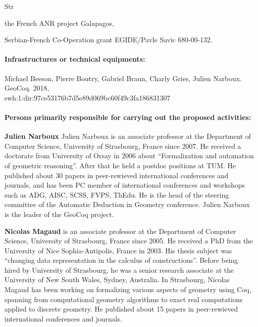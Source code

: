 \begin{sitedescription}{Str}
\begin{compactitem}
\item the French ANR project Galapagos,
\item Serbian-French Co-Operation grant EGIDE/Pavle Savic 680-00-132.
\end{compactitem}

\paragraph*{Infrastructures or technical equipments:}

\begin{compactitem}
\item Michael Beeson, Pierre Boutry, Gabriel Braun, Charly Gries, Julien Narboux. GeoCoq. 2018,\\swh:1:dir:97ce53176b7d5e89d069bc60f49c3fa186831307
\end{compactitem}

\paragraph*{Persons primarily responsible for carrying out the proposed activities:}

\begin{compactitem}
\item{\bf Julien Narboux}
Julien Narboux is an associate professor at the Department of Computer Science, University of Strasbourg, France since 2007. He received a doctorate from University of Orsay in 2006 about “Formalization and automation of geometric reasoning”. After that he held a postdoc positions at TUM.
He published about 30 papers in peer-rewieved international conferences and journals, and has been PC member of international conferences and workshops such as ADG, AISC, SCSS, FVPS, ThEdu. He is the head of the steering committee of the Automatic Deduction in Geometry conference. Julien Narboux is the leader of the GeoCoq project.

\item{\bf Nicolas Magaud} is an associate professor at the Department of
Computer Science, University of Strasbourg, France since 2005. He
received a PhD from the University of Nice Sophia-Antipolis, France in
2003. His thesis subject was ``changing data representation in the
calculus of constructions''. Before being hired by University of
Strasbourg, he was a senior research associate at the University of
New South Wales, Sydney, Australia. In Strasbourg, Nicolas Magaud
has been working on formalizing various aspects of geometry using Coq, spanning from
computational geometry algorithms to exact real computations applied to
discrete geometry. He published about 15 papers in peer-rewieved
international conferences and journals.  


\end{compactitem}
\end{sitedescription}
